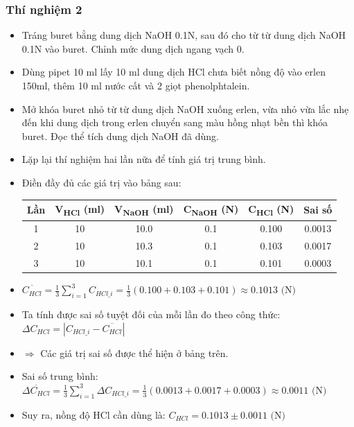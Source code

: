 \subsubsection{Thí nghiệm 2}
\begin{itemize}
    \item Tráng buret bằng dung dịch NaOH 0.1N, sau đó cho từ từ dung dịch NaOH 0.1N vào buret. Chỉnh mức dung dịch ngang vạch 0.
    \item Dùng pipet 10 ml lấy 10 ml dung dịch HCl chưa biết nồng độ vào erlen 150ml, thêm 10 ml nước cất và 2 giọt phenolphtalein.
    \item Mở khóa buret nhỏ từ từ dung dịch NaOH xuống erlen, vừa nhỏ vừa lắc nhẹ đến khi dung dịch trong erlen chuyển sang màu hồng nhạt bền thì khóa buret. Đọc thể tích dung dịch NaOH đã dùng.
    \item Lặp lại thí nghiệm hai lần nữa để tính giá trị trung bình.
    \item Điền đầy đủ các giá trị vào bảng sau:
    \begin{table}[H]
        \centering
        \begin{tabular}{|c|c|c|c|c|c|}
            \hline
            \textbf{Lần} & \textbf{V\textsubscript{HCl} (ml)} & \textbf{V\textsubscript{NaOH} (ml)} & \textbf{C\textsubscript{NaOH} (N)} & \textbf{C\textsubscript{HCl} (N)} & \textbf{Sai số} \\
            \hline
            1 & 10 & 10.0 & 0.1 & 0.100 & 0.0013 \\
            \hline
            2 & 10 & 10.3 & 0.1 & 0.103 & 0.0017 \\
            \hline
            3 & 10 & 10.1 & 0.1 & 0.101 & 0.0003 \\
            \hline
        \end{tabular}
    \end{table}
    \item $\overline{C_{HCl}} = \frac{1}{3} \sum_{i=1}^{3} C_{HCl\_i} = \frac{1}{3}(0.100 + 0.103 + 0.101) \approx 0.1013 \text{ (N)}$
    \item Ta tính được sai số tuyệt đối của mỗi lần đo theo công thức: $\Delta C_{HCl} = |C_{HCl\_i} - \overline{C_{HCl}}|$
    \item $\Rightarrow$ Các giá trị sai số được thể hiện ở bảng trên.
    \item Sai số trung bình: $\overline{\Delta C_{HCl}} = \frac{1}{3} \sum_{i=1}^{3} \Delta C_{HCl\_i} = \frac{1}{3}(0.0013 + 0.0017 + 0.0003) \approx 0.0011 \text{ (N)}$
    \item Suy ra, nồng độ HCl cần dùng là: $C_{HCl} = 0.1013 \pm 0.0011 \text{ (N)}$
\end{itemize}

